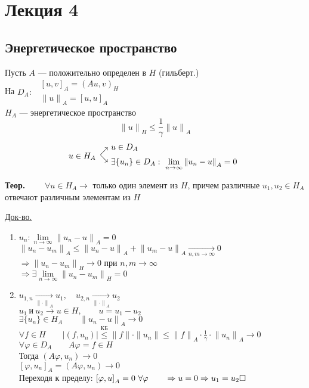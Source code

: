 \section{Лекция 4}

\subsection{Энергетическое пространство}

Пусть $A$ --- положительно определен в $H$ (гильберт.) \\
На $D_A: \enspace \begin{array}{l}
	{[u, v]}_A = {(A u, v)}_H \\
	{\|u\|}_A = {[u,u]}_A
\end{array} $ \\
$ H_A $ --- энергетическое пространство
\[ {\|u\|}_H \leq \frac{1}{\gamma   } {\|u\|}_A \label{4.0} \tag{4.0} \]
\[ u \in H_A \begin{array}{l@{\ }l}
	\raisebox{-1ex}{$\nearrow$} & u \in D_A \\
	\raisebox{1ex}{$\searrow$} & \exists \{ u_n \} \in D_A: \ \lim\limits_{n \rightarrow \infty} {\|u_n - u\|}_A = 0
\end{array} \]


\textbf{Теор.} $ \qquad \forall u \in H_A \rightarrow $ только один элемент из $H$, причем различные $u_1, u_2 \in H_A$ отвечают различным элементам из $H$

\underline{Док-во.}

\begin{enumerate}
	\item
	$ {u_n}: \lim\limits_{n \rightarrow \infty} {\|u_n - u\|}_A = 0 $ \\
	$ {\|u_n - u_m\|}_A \leq {\|u_n - u\|}_A + {\|u_m - u\|}_A \underset{n,m \rightarrow \infty}{\rightarrow} 0 $ \\
	$ \Rightarrow {\|u_n - u_m\|}_H \rightarrow 0 $ при $ n,m \rightarrow \infty $ \\
	$ \Rightarrow \exists \lim\limits_{n \rightarrow \infty} {\|u_n - u_m\|}_H = 0 $
	
	\item
	$ u_{1, n} \underset{{\|\cdot\|}_A}{\rightarrow}  u_1, \quad u_{2, n} \underset{{\|\cdot\|}_A}{\rightarrow}  u_2 $ \\
	$ u_1 \ \text{и} \ u_2 \rightarrow u \in H, \qquad u = u_1 - u_2$ \\
	$ \exists \{u_n\} \in H_A \qquad {\|u_n - u\|}_A \rightarrow 0 $ \\
	$ \forall f \in H \qquad |(f, u_n)| \overset{\text{КБ}}{\leq} \|f\|\cdot\|u_n\| \leq {\|f\|}_A\cdot\frac{1}{\gamma}\cdot{\|u_n\|}_A \rightarrow 0 $ \\
	$ \forall \varphi \in D_A \qquad A\varphi = f \in H $ \\
	Тогда $ (A\varphi, u_n) \rightarrow 0 $ \\
	$ {[\varphi, u_n]}_A = (A\varphi, u_n) \rightarrow 0 $ \\
	Переходя к пределу: $ {[\varphi, u]}_A = 0 \ \forall \varphi \qquad \Rightarrow u = 0 \Rightarrow u_1 = u_2 \hfill \square $
\end{enumerate}

